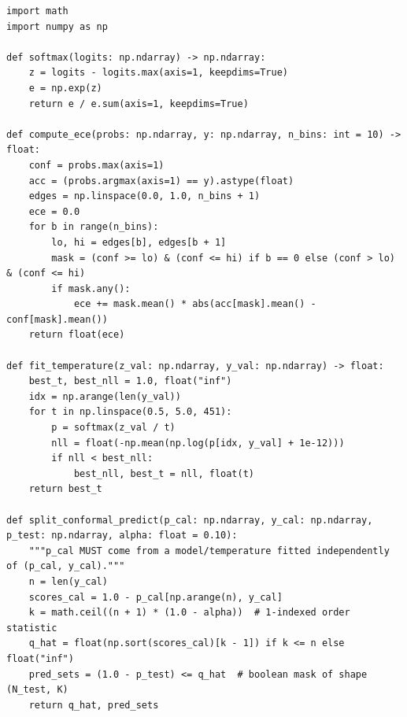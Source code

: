 \begin{lstlisting}[caption={ECE、独立温度缩放与精确分裂共形预测的完整 NumPy 实现}]
import math
import numpy as np

def softmax(logits: np.ndarray) -> np.ndarray:
    z = logits - logits.max(axis=1, keepdims=True)
    e = np.exp(z)
    return e / e.sum(axis=1, keepdims=True)

def compute_ece(probs: np.ndarray, y: np.ndarray, n_bins: int = 10) -> float:
    conf = probs.max(axis=1)
    acc = (probs.argmax(axis=1) == y).astype(float)
    edges = np.linspace(0.0, 1.0, n_bins + 1)
    ece = 0.0
    for b in range(n_bins):
        lo, hi = edges[b], edges[b + 1]
        mask = (conf >= lo) & (conf <= hi) if b == 0 else (conf > lo) & (conf <= hi)
        if mask.any():
            ece += mask.mean() * abs(acc[mask].mean() - conf[mask].mean())
    return float(ece)

def fit_temperature(z_val: np.ndarray, y_val: np.ndarray) -> float:
    best_t, best_nll = 1.0, float("inf")
    idx = np.arange(len(y_val))
    for t in np.linspace(0.5, 5.0, 451):
        p = softmax(z_val / t)
        nll = float(-np.mean(np.log(p[idx, y_val] + 1e-12)))
        if nll < best_nll:
            best_nll, best_t = nll, float(t)
    return best_t

def split_conformal_predict(p_cal: np.ndarray, y_cal: np.ndarray, p_test: np.ndarray, alpha: float = 0.10):
    """p_cal MUST come from a model/temperature fitted independently of (p_cal, y_cal)."""
    n = len(y_cal)
    scores_cal = 1.0 - p_cal[np.arange(n), y_cal]
    k = math.ceil((n + 1) * (1.0 - alpha))  # 1-indexed order statistic
    q_hat = float(np.sort(scores_cal)[k - 1]) if k <= n else float("inf")
    pred_sets = (1.0 - p_test) <= q_hat  # boolean mask of shape (N_test, K)
    return q_hat, pred_sets
\end{lstlisting}

